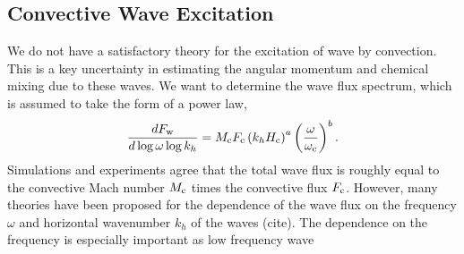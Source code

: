 {\color{purple}
\subsection{Convective Wave Excitation}
}

We do not have a satisfactory theory for the excitation of wave by convection. This is a key uncertainty in estimating the angular momentum and chemical mixing due to these waves. We want to determine the wave flux spectrum, which is assumed to take the form of a power law,
\begin{equation}
\frac{d F_{\rm w}}{d\log \omega \log k_h} = M_{\rm c}F_{\rm c} \left(k_h H_{\rm c}\right)^{a} \left(\frac{\omega}{\omega_{\rm c}}\right)^{b}.
\end{equation}
Simulations and experiments agree that the total wave flux is roughly equal to the convective Mach number $M_{\rm c}$ times the convective flux $F_{\rm c}$. However, many theories have been proposed for the dependence of the wave flux on the frequency $\omega$ and horizontal wavenumber $k_h$ of the waves (cite). The dependence on the frequency is especially important as low frequency wave
